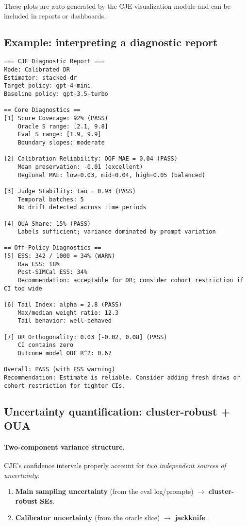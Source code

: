 These plots are auto-generated by the CJE visualization module and can be included in reports or dashboards.

\subsection{Example: interpreting a diagnostic report}

\begin{lstlisting}
=== CJE Diagnostic Report ===
Mode: Calibrated DR
Estimator: stacked-dr
Target policy: gpt-4-mini
Baseline policy: gpt-3.5-turbo

== Core Diagnostics ==
[1] Score Coverage: 92% (PASS)
    Oracle S range: [2.1, 9.8]
    Eval S range: [1.9, 9.9]
    Boundary slopes: moderate

[2] Calibration Reliability: OOF MAE = 0.04 (PASS)
    Mean preservation: -0.01 (excellent)
    Regional MAE: low=0.03, mid=0.04, high=0.05 (balanced)

[3] Judge Stability: tau = 0.93 (PASS)
    Temporal batches: 5
    No drift detected across time periods

[4] OUA Share: 15% (PASS)
    Labels sufficient; variance dominated by prompt variation

== Off-Policy Diagnostics ==
[5] ESS: 342 / 1000 = 34% (WARN)
    Raw ESS: 18%
    Post-SIMCal ESS: 34%
    Recommendation: acceptable for DR; consider cohort restriction if CI too wide

[6] Tail Index: alpha = 2.8 (PASS)
    Max/median weight ratio: 12.3
    Tail behavior: well-behaved

[7] DR Orthogonality: 0.03 [-0.02, 0.08] (PASS)
    CI contains zero
    Outcome model OOF R^2: 0.67

Overall: PASS (with ESS warning)
Recommendation: Estimate is reliable. Consider adding fresh draws or cohort restriction for tighter CIs.
\end{lstlisting}

\subsection{Uncertainty quantification: cluster-robust + OUA}

\paragraph{Two-component variance structure.} CJE's confidence intervals properly account for \emph{two independent sources of uncertainty}:
\begin{enumerate}
\item \textbf{Main sampling uncertainty} (from the eval log/prompts) $\to$ \textbf{cluster-robust SEs}.
\item \textbf{Calibrator uncertainty} (from the oracle slice) $\to$ \textbf{\oua{} jackknife}.
\end{enumerate}

